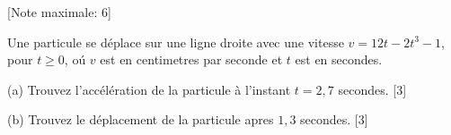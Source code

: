 \begin{question}
  \hspace*{\fill} [Note maximale: 6]\par
  \medskip
  \noindent Une particule se déplace sur une ligne droite avec une vitesse $v = 12t - 2t^3 - 1$, pour $t \ge 0$, oú $v$ est en centimetres par seconde et $t$ est en secondes.\par
  \medskip
  (a) Trouvez l’accélération de la particule à l’instant $t = 2,7$ secondes.\hspace*{\fill} [3]\par
  \medskip
  (b) Trouvez le déplacement de la particule apres $1,3$ secondes.\hspace*{\fill} [3]\par
\end{question}

